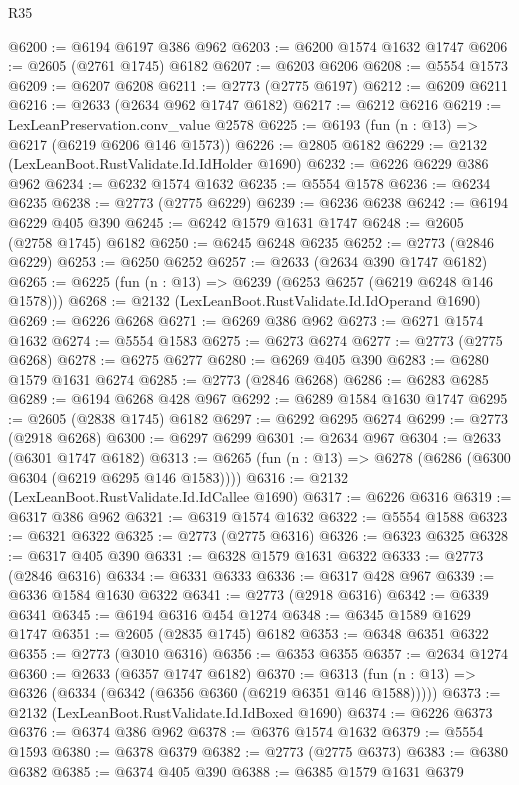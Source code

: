 \begin{lexlean}{R35}
\begin{coremodule}
@6200 := @6194 @6197 @386 @962
@6203 := @6200 @1574 @1632 @1747
@6206 := @2605 (@2761 @1745) @6182
@6207 := @6203 @6206
@6208 := @5554 @1573
@6209 := @6207 @6208
@6211 := @2773 (@2775 @6197)
@6212 := @6209 @6211
@6216 := @2633 (@2634 @962 @1747 @6182)
@6217 := @6212 @6216
@6219 := LexLeanPreservation.conv_value @2578
@6225 := @6193 (fun (n : @13) => @6217 (@6219 @6206 @146 @1573))
@6226 := @2805 @6182
@6229 := @2132 (LexLeanBoot.RustValidate.Id.IdHolder @1690)
@6232 := @6226 @6229 @386 @962
@6234 := @6232 @1574 @1632
@6235 := @5554 @1578
@6236 := @6234 @6235
@6238 := @2773 (@2775 @6229)
@6239 := @6236 @6238
@6242 := @6194 @6229 @405 @390
@6245 := @6242 @1579 @1631 @1747
@6248 := @2605 (@2758 @1745) @6182
@6250 := @6245 @6248 @6235
@6252 := @2773 (@2846 @6229)
@6253 := @6250 @6252
@6257 := @2633 (@2634 @390 @1747 @6182)
@6265 := @6225 (fun (n : @13) => @6239 (@6253 @6257 (@6219 @6248 @146 @1578)))
@6268 := @2132 (LexLeanBoot.RustValidate.Id.IdOperand @1690)
@6269 := @6226 @6268
@6271 := @6269 @386 @962
@6273 := @6271 @1574 @1632
@6274 := @5554 @1583
@6275 := @6273 @6274
@6277 := @2773 (@2775 @6268)
@6278 := @6275 @6277
@6280 := @6269 @405 @390
@6283 := @6280 @1579 @1631 @6274
@6285 := @2773 (@2846 @6268)
@6286 := @6283 @6285
@6289 := @6194 @6268 @428 @967
@6292 := @6289 @1584 @1630 @1747
@6295 := @2605 (@2838 @1745) @6182
@6297 := @6292 @6295 @6274
@6299 := @2773 (@2918 @6268)
@6300 := @6297 @6299
@6301 := @2634 @967
@6304 := @2633 (@6301 @1747 @6182)
@6313 := @6265 (fun (n : @13) => @6278 (@6286 (@6300 @6304 (@6219 @6295 @146 @1583))))
@6316 := @2132 (LexLeanBoot.RustValidate.Id.IdCallee @1690)
@6317 := @6226 @6316
@6319 := @6317 @386 @962
@6321 := @6319 @1574 @1632
@6322 := @5554 @1588
@6323 := @6321 @6322
@6325 := @2773 (@2775 @6316)
@6326 := @6323 @6325
@6328 := @6317 @405 @390
@6331 := @6328 @1579 @1631 @6322
@6333 := @2773 (@2846 @6316)
@6334 := @6331 @6333
@6336 := @6317 @428 @967
@6339 := @6336 @1584 @1630 @6322
@6341 := @2773 (@2918 @6316)
@6342 := @6339 @6341
@6345 := @6194 @6316 @454 @1274
@6348 := @6345 @1589 @1629 @1747
@6351 := @2605 (@2835 @1745) @6182
@6353 := @6348 @6351 @6322
@6355 := @2773 (@3010 @6316)
@6356 := @6353 @6355
@6357 := @2634 @1274
@6360 := @2633 (@6357 @1747 @6182)
@6370 := @6313 (fun (n : @13) => @6326 (@6334 (@6342 (@6356 @6360 (@6219 @6351 @146 @1588)))))
@6373 := @2132 (LexLeanBoot.RustValidate.Id.IdBoxed @1690)
@6374 := @6226 @6373
@6376 := @6374 @386 @962
@6378 := @6376 @1574 @1632
@6379 := @5554 @1593
@6380 := @6378 @6379
@6382 := @2773 (@2775 @6373)
@6383 := @6380 @6382
@6385 := @6374 @405 @390
@6388 := @6385 @1579 @1631 @6379

\end{coremodule}
\end{lexlean}
